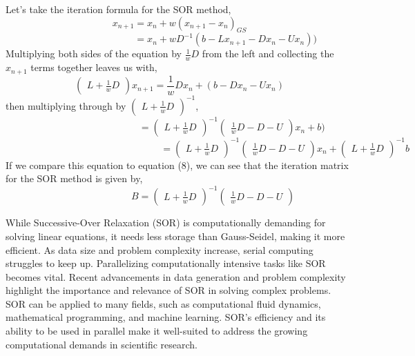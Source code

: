 \documentclass[11pt]{article}
\begin{document}
Let's take the iteration formula for the SOR method,
\begin{equation*}
x_{n+1} = x_n + w(x_{n+1}-x_{n})_{GS}
\end{equation*}
\begin{equation*}
\phantom{cccccccccccccccccccccc} = x_n + wD^{-1}(b-Lx_{n+1}-Dx_n-Ux_n))
\end{equation*}
Multiplying both sides of the equation by $\frac{1}{w}D$ from the left and collecting the $x_{n+1}$ terms together leaves us with,
\begin{equation*}
\begin{pmatrix}
L+\frac{1}{w}D\end{pmatrix}x_{n+1} = \frac{1}{w}Dx_n + (b-Dx_n-Ux_n)
\end{equation*}
then multiplying through by
$\begin{pmatrix} L+\frac{1}{w}D 
\end{pmatrix}^{-1}$,
\vspace{-5pt}
\begin{equation*}
\phantom{cccccccccccccccccccccccc,} = 
\begin{pmatrix}
L+\frac{1}{w}D
\end{pmatrix}^{-1}
\begin{pmatrix}
\frac{1}{w}D-D-U
\end{pmatrix}
x_n+b)
\end{equation*}
\begin{equation*}
\phantom{ccccccccccccccccccccccccccccccccccccc} = 
\begin{pmatrix}
L+\frac{1}{w}D
\end{pmatrix}^{-1}
\begin{pmatrix}
\frac{1}{w}D-D-U
\end{pmatrix}
x_n+\begin{pmatrix}
L+\frac{1}{w}D
\end{pmatrix}^{-1}b
\end{equation*}
If we compare this equation to equation (8), we can see that the iteration matrix for the SOR method is given by,
\vspace{-2pt}
\\$$\phantom{cccccccccccccccc}B = 
\begin{pmatrix}L+\frac{1}{w}D
\end{pmatrix}^{-1} 
\begin{pmatrix}\frac{1}{w}D-D-U
\end{pmatrix}$$

While Successive-Over Relaxation (SOR) is computationally demanding for solving linear equations, it needs less storage than Gauss-Seidel, making it more efficient. As data size and problem complexity increase, serial computing struggles to keep up. Parallelizing computationally intensive tasks like SOR becomes vital. Recent advancements in data generation and problem complexity highlight the importance and relevance of SOR in solving complex problems. SOR can be applied to many fields, such as computational fluid dynamics, mathematical programming, and machine learning. SOR's efficiency and its ability to be used in parallel make it well-suited to address the growing computational demands in scientific research.
\end{document}
